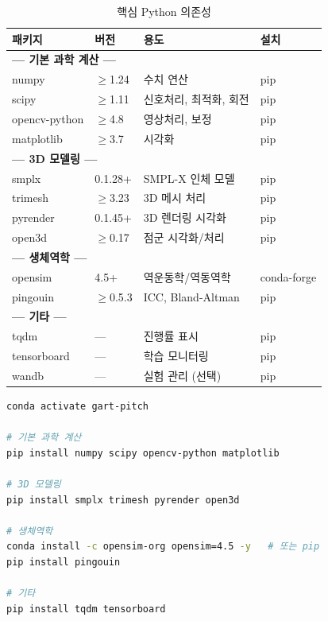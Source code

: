 \documentclass[11pt, a4paper]{report}
\begin{document}
\begin{table}[H]
\centering
\caption{핵심 Python 의존성}
\label{tab:python_deps}
\renewcommand{\arraystretch}{1.2}
\small
\begin{tabular}{llll}
\toprule
\textbf{패키지} & \textbf{버전} & \textbf{용도} & \textbf{설치} \\
\midrule
\multicolumn{4}{l}{\textbf{--- 기본 과학 계산 ---}} \\
numpy & $\geq$1.24 & 수치 연산 & pip \\
scipy & $\geq$1.11 & 신호처리, 최적화, 회전 & pip \\
opencv-python & $\geq$4.8 & 영상처리, 보정 & pip \\
matplotlib & $\geq$3.7 & 시각화 & pip \\
\midrule
\multicolumn{4}{l}{\textbf{--- 3D 모델링 ---}} \\
smplx & 0.1.28+ & SMPL-X 인체 모델 & pip \\
trimesh & $\geq$3.23 & 3D 메시 처리 & pip \\
pyrender & 0.1.45+ & 3D 렌더링 시각화 & pip \\
open3d & $\geq$0.17 & 점군 시각화/처리 & pip \\
\midrule
\multicolumn{4}{l}{\textbf{--- 생체역학 ---}} \\
opensim & 4.5+ & 역운동학/역동역학 & conda-forge \\
pingouin & $\geq$0.5.3 & ICC, Bland-Altman & pip \\
\midrule
\multicolumn{4}{l}{\textbf{--- 기타 ---}} \\
tqdm & --- & 진행률 표시 & pip \\
tensorboard & --- & 학습 모니터링 & pip \\
wandb & --- & 실험 관리 (선택) & pip \\
\bottomrule
\end{tabular}
\end{table}

\begin{termbox}[title={기본 패키지 일괄 설치}]
\begin{lstlisting}[language=bash, numbers=none]
conda activate gart-pitch

# 기본 과학 계산
pip install numpy scipy opencv-python matplotlib

# 3D 모델링
pip install smplx trimesh pyrender open3d

# 생체역학
conda install -c opensim-org opensim=4.5 -y   # 또는 pip
pip install pingouin

# 기타
pip install tqdm tensorboard
\end{lstlisting}
\end{termbox}
\end{document}
